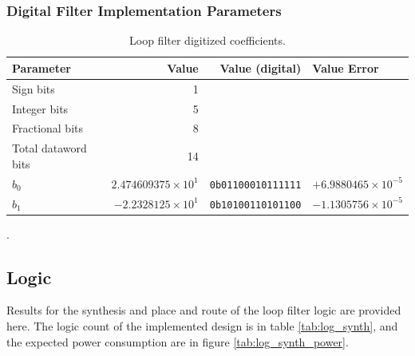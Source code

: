 		\subsubsection{Digital Filter Implementation Parameters}
		\begin{table}[h!]
			\centering
			\def\arraystretch{1.5}		
			\setlength\arrayrulewidth{0.75pt}
			\setlength{\tabcolsep}{1em} %
			\begin{tabular}{|l|r|r|l|}
				\hline 
				\rule[-1ex]{0pt}{2.5ex} \cellcolor{gray!40}\textbf{Parameter} & \cellcolor{gray!40}\textbf{Value} & \cellcolor{gray!40}\textbf{Value (digital) } & \cellcolor{gray!40}\textbf{Value Error}\\ 
				\hline 
				\rule[-1ex]{0pt}{2.5ex} Sign bits & 1 & & \\ 
				\hline 
				\rule[-1ex]{0pt}{2.5ex} Integer bits & 5 & & \\ 
				\hline 
				\rule[-1ex]{0pt}{2.5ex} Fractional bits & 8 & & \\ 
				\hline 
				\rule[-1ex]{0pt}{2.5ex} Total dataword bits & 14 & & \\ 
				\hline 
				\rule[-1ex]{0pt}{2.5ex} \textbf{$b_0$}  & $2.474609375\times10^1$ & \texttt{0b01100010111111}  & $+6.9880465\times10^{-5}$\\ 
				\hline 
				\rule[-1ex]{0pt}{2.5ex} \textbf{$b_1$}  & $-2.2328125\times10^1$ & \texttt{0b10100110101100}  & $-1.1305756\times10^{-5}$\\
				\hline 

			\end{tabular} 
			\caption{Loop filter digitized coefficients.}
			\label{dig_filter_params_fast}
		\end{table}  

{\color{white}.}
\FloatBarrier\pagebreak
\subsection{Logic}
Results for the synthesis and place and route of the loop filter logic are provided here. The logic count of the implemented design is in table \ref{tab:log_synth}, and the expected power consumption are in figure \ref{tab:log_synth_power}.

